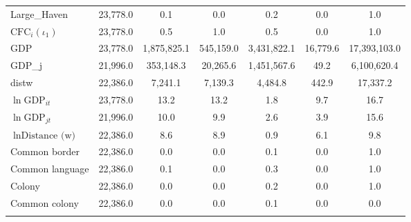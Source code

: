 \begin{center}
\begin{tabular}{lcccccc}
Large\_Haven & 23,778.0 & 0.1 & 0.0 & 0.2 & 0.0 & 1.0 \\
$\text{CFC}_i$$ (\iota_1)$ & 23,778.0 & 0.5 & 1.0 & 0.5 & 0.0 & 1.0 \\
GDP & 23,778.0 & 1,875,825.1 & 545,159.0 & 3,431,822.1 & 16,779.6 & 17,393,103.0 \\
GDP\_j & 21,996.0 & 353,148.3 & 20,265.6 & 1,451,567.6 & 49.2 & 6,100,620.4 \\
distw & 22,386.0 & 7,241.1 & 7,139.3 & 4,484.8 & 442.9 & 17,337.2 \\
$\ln\text{GDP}_{it}$ & 23,778.0 & 13.2 & 13.2 & 1.8 & 9.7 & 16.7 \\
$\ln\text{GDP}_{jt}$ & 21,996.0 & 10.0 & 9.9 & 2.6 & 3.9 & 15.6 \\
$\ln\text{Distance (w)}$ & 22,386.0 & 8.6 & 8.9 & 0.9 & 6.1 & 9.8 \\
Common border & 22,386.0 & 0.0 & 0.0 & 0.1 & 0.0 & 1.0 \\
Common language & 22,386.0 & 0.1 & 0.0 & 0.3 & 0.0 & 1.0 \\
Colony & 22,386.0 & 0.0 & 0.0 & 0.2 & 0.0 & 1.0 \\
Common colony & 22,386.0 & 0.0 & 0.0 & 0.1 & 0.0 & 0.0 \\
 & \begin{footnotesize}\end{footnotesize} & \begin{footnotesize}\end{footnotesize} & \begin{footnotesize}\end{footnotesize} & \begin{footnotesize}\end{footnotesize} & \begin{footnotesize}\end{footnotesize} & \begin{footnotesize}\end{footnotesize} \\ \hline
\end{tabular}
\end{center}
